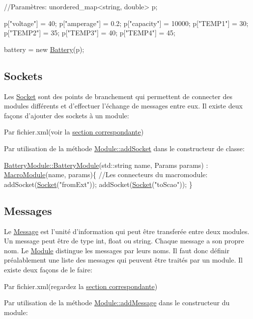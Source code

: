 \begin{DoxyCode}
\textcolor{comment}{//Paramètres:}
unordered\_map<string, double> p;

p[\textcolor{stringliteral}{"voltage"}] = 40;
p[\textcolor{stringliteral}{"amperage"}] = 0.2;
p[\textcolor{stringliteral}{"capacity"}] = 10000;
p[\textcolor{stringliteral}{"TEMP1"}] = 30;
p[\textcolor{stringliteral}{"TEMP2"}] = 35;
p[\textcolor{stringliteral}{"TEMP3"}] = 40;
p[\textcolor{stringliteral}{"TEMP4"}] = 45;

battery = \textcolor{keyword}{new} \hyperlink{classBattery}{Battery}(p);
\end{DoxyCode}
\hypertarget{docModule_sockets}{}\subsection{Sockets}\label{docModule_sockets}
Les \hyperlink{classSocket}{Socket} sont des points de branchement qui permettent de connecter des modules différents et d'effectuer l'échange de messages entre eux. Il existe deux façons d'ajouter des sockets à un module\-:
\begin{DoxyItemize}
\item Par fichier.\-xml(voir la \hyperlink{xmlRef}{section correspondante})
\item Par utilisation de la méthode \hyperlink{classModule_aeb7302c667eb923a4dc25ae235c744dc}{Module\-::add\-Socket} dans le constructeur de classe\-: 
\begin{DoxyCode}
\hyperlink{classBatteryModule_a2fb494ef5f124c38c0fdf9ccfb31918f}{BatteryModule::BatteryModule}(std::string name, Params params) : 
      \hyperlink{classMacroModule}{MacroModule}(name, params)\{
    \textcolor{comment}{//Les connecteurs du macromodule:}
    addSocket(\hyperlink{classSocket}{Socket}(\textcolor{stringliteral}{"fromExt"}));
    addSocket(\hyperlink{classSocket}{Socket}(\textcolor{stringliteral}{"toScao"}));
\}
\end{DoxyCode}

\end{DoxyItemize}\hypertarget{docModule_messages}{}\subsection{Messages}\label{docModule_messages}
Le \hyperlink{classMessage}{Message} est l'unité d'information qui peut être transferée entre deux modules. Un message peut être de type int, float ou string. Chaque message a son propre nom. Le \hyperlink{classModule}{Module} distingue les messages par leurs noms. Il faut donc définir préalablement une liste des messages qui peuvent être traités par un module. Il existe deux façons de le faire\-:
\begin{DoxyItemize}
\item Par fichier.\-xml(regardez la \hyperlink{xmlRef}{section correspondante})
\item Par utilisation de la méthode \hyperlink{classModule_a146f454fded03cda14359e419086afa5}{Module\-::add\-Message} dans le constructeur du module\-:
\end{DoxyItemize}


